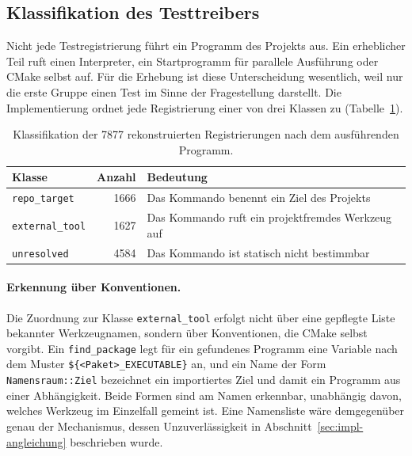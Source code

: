 \documentclass[12pt,a4paper,twoside,headsepline,parskip=half]{scrreprt}
\begin{document}
\subsection{Klassifikation des Testtreibers}
\label{sec:impl-treiber}

Nicht jede Testregistrierung führt ein Programm des Projekts aus. Ein erheblicher Teil
ruft einen Interpreter, ein Startprogramm für parallele Ausführung oder CMake selbst
auf. Für die Erhebung ist diese Unterscheidung wesentlich, weil nur die erste Gruppe
einen Test im Sinne der Fragestellung darstellt. Die Implementierung ordnet jede
Registrierung einer von drei Klassen zu (Tabelle~\ref{tab:impl-treiber}).

\begin{table}[H]
    \centering
    \small
    \begin{tabularx}{\textwidth}{l r X}
        \toprule
        \textbf{Klasse} & \textbf{Anzahl} & \textbf{Bedeutung} \\
        \midrule
        \texttt{repo\_target}   & 1666 & Das Kommando benennt ein Ziel des Projekts \\
        \texttt{external\_tool} & 1627 & Das Kommando ruft ein projektfremdes Werkzeug auf \\
        \texttt{unresolved}     & 4584 & Das Kommando ist statisch nicht bestimmbar \\
        \bottomrule
    \end{tabularx}
    \caption{Klassifikation der 7877 rekonstruierten Registrierungen nach dem
    ausführenden Programm.}
    \label{tab:impl-treiber}
\end{table}

\paragraph{Erkennung über Konventionen.}
Die Zuordnung zur Klasse \texttt{external\_tool} erfolgt nicht über eine gepflegte
Liste bekannter Werkzeugnamen, sondern über Konventionen, die CMake selbst vorgibt.
Ein \texttt{find\_package} legt für ein gefundenes Programm eine Variable nach dem
Muster \texttt{\$\{<Paket>\_EXECUTABLE\}} an, und ein Name der Form
\texttt{Namensraum::Ziel} bezeichnet ein importiertes Ziel und damit ein Programm aus
einer Abhängigkeit. Beide Formen sind am Namen erkennbar, unabhängig davon, welches
Werkzeug im Einzelfall gemeint ist. Eine Namensliste wäre demgegenüber genau der
Mechanismus, dessen Unzuverlässigkeit in Abschnitt~\ref{sec:impl-angleichung}
beschrieben wurde.
\end{document}
